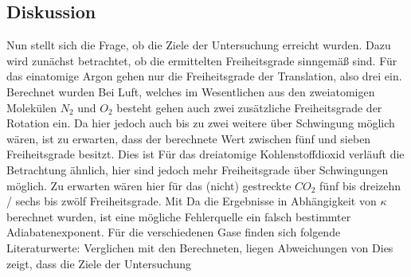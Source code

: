 	\subsection{Diskussion}
	
		Nun stellt sich die Frage, ob die Ziele der Untersuchung erreicht wurden.
		Dazu wird zunächst betrachtet, ob die ermittelten Freiheitsgrade sinngemäß sind.
		Für das einatomige Argon gehen nur die Freiheitsgrade der Translation, also drei ein.
		Berechnet wurden %
		Bei Luft, welches im Wesentlichen aus den zweiatomigen Molekülen $N_2$ und $O_2$ besteht gehen auch zwei zusätzliche Freiheitsgrade der Rotation ein. 
		Da hier jedoch auch bis zu zwei weitere über Schwingung möglich wären, ist zu erwarten, dass der berechnete Wert zwischen fünf und sieben Freiheitsgrade besitzt.
		Dies ist %
		Für das dreiatomige Kohlenstoffdioxid verläuft die Betrachtung ähnlich, hier sind jedoch mehr Freiheitsgrade über Schwingungen möglich.
		Zu erwarten wären hier für das (nicht) gestreckte $CO_2$ fünf bis dreizehn / sechs bis zwölf Freiheitsgrade.
		Mit %
		Da die Ergebnisse in Abhängigkeit von $\kappa$ berechnet wurden, ist eine mögliche Fehlerquelle ein falsch bestimmter Adiabatenexponent.
		Für die verschiedenen Gase finden sich folgende Literaturwerte: %
		Verglichen mit den Berechneten, liegen Abweichungen von %
		Dies zeigt, dass die Ziele der Untersuchung %
